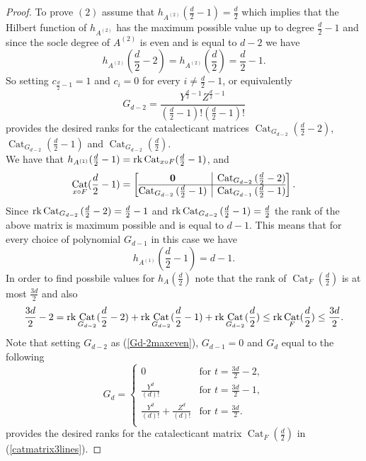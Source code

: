 \documentclass[12pt]{amsart}
\numberwithin{equation}{section}
\theoremstyle{plain} \newtheorem{theorem}{Theorem}[section]
\theoremstyle{definition} \newtheorem{definition}[theorem]{Definition}
\DeclareMathOperator{\Cat}{Cat}\DeclareMathOperator{\B}{\mathcal{B}}
\begin{document}
\begin{proof}
To prove $(2)$ assume that $h_{A^{(2)}}(\frac{d}{2}-1)=\frac{d}{2}$ which  implies that the Hilbert function of $h_{A^{(2)}}$ has the maximum possible value up to degree $\frac{d}{2}-1$ and since the socle degree of $A^{(2)}$ is even and is equal to $d-2$ we have  $$h_{A^{(2)}}(\frac{d}{2}-2)=h_{A^{(2)}}(\frac{d}{2})=\frac{d}{2}-1.$$ So setting $c_{\frac{d}{2}-1}=1$ and $c_i=0$ for every $i\neq \frac{d}{2}-1$, or equivalently
\begin{equation}\label{Gd-2maxeven}
G_{d-2} = \frac{Y^{\frac{d}{2}-1}Z^{\frac{d}{2}-1}}{(\frac{d}{2}-1)!(\frac{d}{2}-1)!}
\end{equation}
provides  the desired ranks for the catalecticant matrices $\Cat_{G_{d-2}}(\frac{d}{2}-2)$, $\Cat_{G_{d-2}}(\frac{d}{2}-1)$ and $\Cat_{G_{d-2}}(\frac{d}{2})$. \\ 
We have that $h_{{A^{(1)}}}(\frac{d}{2}-1)=\rk\Cat_{x\circ F}(\frac{d}{2}-1)$, and 
\begin{equation}
\Cat_{x\circ F}(\frac{d}{2}-1) = \left[\begin{array}{@{}c|c@{}}
 \mathbf{0}&{\Cat_{G_{d-2}}{(\frac{d}{2}-2)}}
\\\hline
\Cat_{G_{d-2}}{(\frac{d}{2}-1)}&\Cat_{G_{d-1}}{(\frac{d}{2}-1)}\\
\end{array}
\right].\\
\end{equation}
Since $\rk {\Cat_{G_{d-2}}{(\frac{d}{2}-2)}}=\frac{d}{2}-1$ and $\rk\Cat_{G_{d-2}}{(\frac{d}{2}-1)}=\frac{d}{2}$ the rank of the above matrix is maximum possible and is equal to $d-1$. This means that for every choice of polynomial $G_{d-1}$ in this case we have 
$$
h_{A^{(1)}}(\frac{d}{2}-1)=d-1.
$$
In order to find possbile values for $h_A(\frac{d}{2})$ note that the rank of $\Cat_F(\frac{d}{2})$ is at most $\frac{3d}{2}$ and also
$$\frac{3d}{2}-2=\rk\Cat_{G_{d-2}}(\frac{d}{2}-2)+\rk\Cat_{G_{d-2}}(\frac{d}{2}-1)+\rk\Cat_{G_{d-2}}(\frac{d}{2})\leq \rk\Cat_F(\frac{d}{2})\leq \frac{3d}{2}.$$ 
Note that setting $G_{d-2}$ as  (\ref{Gd-2maxeven}), $G_{d-1}=0$ and  $G_d$ equal to the following 
\begin{equation}\label{Gdmaxeven}
G_{d}=\left\{
                \begin{array}{ll}
                  0 & \text{for $t=\frac{3d}{2}-2$},\\
                  \frac{Y^{d}}{(d)!} & \text{for $t=\frac{3d}{2}-1,$}\\
                  \frac{Y^{d}}{(d)!}+ \frac{Z^{d}}{(d)!}& \text{for $t=\frac{3d}{2}$}.\\
                \end{array}
              \right.
\end{equation}
provides the desired ranks for the catalecticant matrix $\Cat_F(\frac{d}{2})$  in (\ref{catmatrix3lines}). 
\end{proof}
\end{document}
